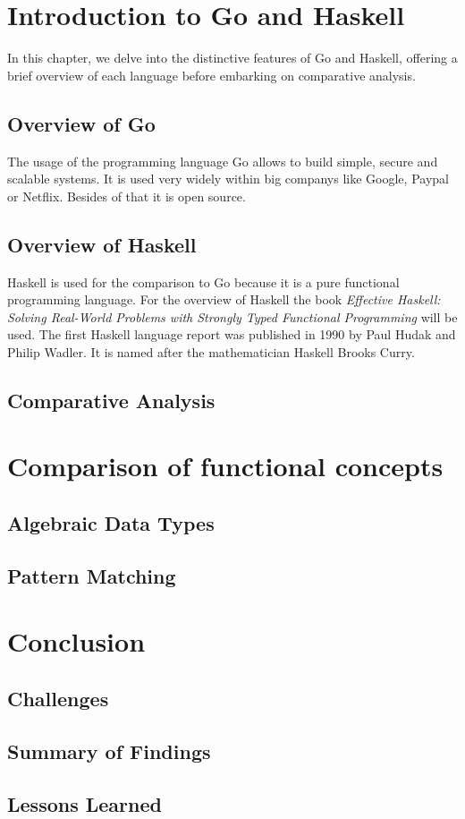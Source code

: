 \chapter{Introduction to Go and Haskell}\label{chap:language-comparison}
In this chapter, we delve into the distinctive features of Go and Haskell, offering a brief overview of each language before embarking on comparative analysis.

    \section{Overview of Go}\label{sec:go-overview}
    The usage of the programming language Go allows to build simple, secure and scalable systems. It is used very widely within big companys like Google, Paypal or Netflix. Besides of that it is open source. \cite{GoWebsite}
    \section{Overview of Haskell}\label{sec:haskell-overview}
    Haskell is used for the comparison to Go because it is a pure functional programming language.
    For the overview of Haskell the book \textit{Effective Haskell: Solving Real-World Problems with Strongly Typed Functional Programming} \cite{Skinner} will be used.
    The first Haskell language report was published in 1990 by Paul Hudak and Philip Wadler. It is named after the mathematician Haskell Brooks Curry.\cite{Hudak2007}

    \section{Comparative Analysis}\label{sec:comparative-analysis}


\chapter{Comparison of functional concepts}
    \section{Algebraic Data Types}\label{sec:algebraic-data-types}
    \section{Pattern Matching}\label{sec:pattern-matching}

\chapter{Conclusion}\label{chap:conclusion}
    \section{Challenges}\label{sec:challenges}
    \section{Summary of Findings}\label{sec:findings-summary}
    \section{Lessons Learned}\label{sec:lessons-learned}
